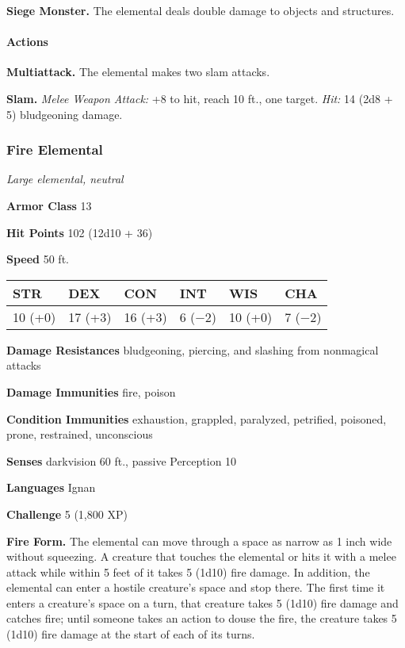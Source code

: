 \documentclass[
]{article}
\begin{document}
\textbf{Siege Monster.} The elemental deals double damage to objects and
structures.

\hypertarget{actions-1}{%
\paragraph{Actions}\label{actions-1}}

\textbf{Multiattack.} The elemental makes two slam attacks.

\textbf{Slam.} \emph{Melee Weapon Attack:} +8 to hit, reach 10 ft., one
target. \emph{Hit:} 14 (2d8 + 5) bludgeoning damage.

\hypertarget{fire-elemental}{%
\subsubsection{Fire Elemental}\label{fire-elemental}}

\emph{Large elemental, neutral}

\textbf{Armor Class} 13

\textbf{Hit Points} 102 (12d10 + 36)

\textbf{Speed} 50 ft.

\begin{longtable}[]{@{}llllll@{}}
\toprule
STR & DEX & CON & INT & WIS & CHA\tabularnewline
\midrule
\endhead
10 (+0) & 17 (+3) & 16 (+3) & 6 (−2) & 10 (+0) & 7 (−2)\tabularnewline
\bottomrule
\end{longtable}

\textbf{Damage Resistances} bludgeoning, piercing, and slashing from
nonmagical attacks

\textbf{Damage Immunities} fire, poison

\textbf{Condition Immunities} exhaustion, grappled, paralyzed,
petrified, poisoned, prone, restrained, unconscious

\textbf{Senses} darkvision 60 ft., passive Perception 10

\textbf{Languages} Ignan

\textbf{Challenge} 5 (1,800 XP)

\textbf{Fire Form.} The elemental can move through a space as narrow as
1 inch wide without squeezing. A creature that touches the elemental or
hits it with a melee attack while within 5 feet of it takes 5 (1d10)
fire damage. In addition, the elemental can enter a hostile creature's
space and stop there. The first time it enters a creature's space on a
turn, that creature takes 5 (1d10) fire damage and catches fire; until
someone takes an action to douse the fire, the creature takes 5 (1d10)
fire damage at the start of each of its turns.
\end{document}
